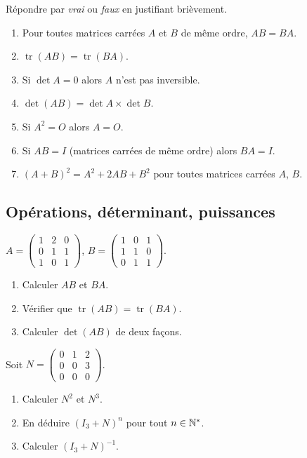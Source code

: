 Répondre par \emph{vrai} ou \emph{faux} en justifiant brièvement.
\begin{enumerate}
	\item Pour toutes matrices carrées $A$ et $B$ de même ordre, $AB = BA$.
	\item $\operatorname{tr}(AB) = \operatorname{tr}(BA)$.
	\item Si $\det A = 0$ alors $A$ n'est pas inversible.
	\item $\det(AB) = \det A \times \det B$.
	\item Si $A^2 = O$ alors $A = O$.
	\item Si $AB = I$ (matrices carrées de même ordre) alors $BA = I$.
	\item $(A + B)^2 = A^2 + 2AB + B^2$ pour toutes matrices carrées $A$, $B$.
\end{enumerate}

\subsection{Opérations, déterminant, puissances}

$A = \begin{pmatrix}1&2&0\\0&1&1\\1&0&1\end{pmatrix}$,
$B = \begin{pmatrix}1&0&1\\1&1&0\\0&1&1\end{pmatrix}$.
\begin{enumerate}
	\item Calculer $AB$ et $BA$.
	\item Vérifier que $\operatorname{tr}(AB) = \operatorname{tr}(BA)$.
	\item Calculer $\det(AB)$ de deux façons.
\end{enumerate}

Soit $N = \begin{pmatrix}0&1&2\\0&0&3\\0&0&0\end{pmatrix}$.
\begin{enumerate}
	\item Calculer $N^2$ et $N^3$.
	\item En déduire $(I_3 + N)^n$ pour tout $n \in \mathbb{N}^*$.
	\item Calculer $(I_3 + N)^{-1}$.
\end{enumerate}

